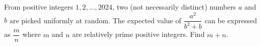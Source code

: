 From positive integers $1, 2,... , 2024$, two (not necessarily distinct) numbers $a$ and $b$ are picked uniformly at random. The expected value of $\dfrac{a^2}{b^2 + b}$ can be expressed as $\dfrac{m}{n}$ where $m$ and $n$ are relatively prime positive integers. Find $m + n$.
